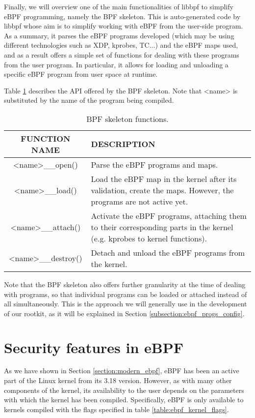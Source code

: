 Finally, we will overview one of the main functionalities of libbpf to simplify eBPF programming, namely the BPF skeleton. This is auto-generated code by libbpf whose aim is to simplify working with eBPF from the user-side program. As a summary, it parses the eBPF programs developed (which may be using different technologies such as XDP, kprobes, TC...) and the eBPF maps used, and as a result offers a simple set of functions for dealing with these programs from the user program. In particular, it allows for loading and unloading a specific eBPF program from user space at runtime.

Table \ref{table:libbpf_skel} describes the API offered by the BPF skeleton. Note that <name> is substituted by the name of the program being compiled.

\begin{table}[htbp]
\begin{tabular}{|c|>{\centering\arraybackslash}p{9cm}|}
\hline
\textbf{FUNCTION NAME} & \textbf{DESCRIPTION}\\
\hline
\hline
<name>\_\_open() & Parse the eBPF programs and maps.\\
\hline
<name>\_\_load() & Load the eBPF map in the kernel after its validation, create the maps. However, the programs are not active yet.\\
\hline
<name>\_\_attach() & Activate the eBPF programs, attaching them to their corresponding parts in the kernel (e.g. kprobes to kernel functions).\\
\hline
<name>\_\_destroy() & Detach and unload the eBPF programs from the kernel.\\
\hline
\end{tabular}
\caption{BPF skeleton functions.}
\label{table:libbpf_skel}
\end{table}

Note that the BPF skeleton also offers further granularity at the time of dealing with programs, so that individual programs can be loaded or attached instead of all simultaneously. This is the approach we will generally use in the development of our rootkit, as it will be explained in Section \ref{subsection:ebpf_progs_config}.



\section{Security features in eBPF} \label{section:ebpf_security}
As we have shown in Section \ref{section:modern_ebpf}, eBPF has been an active part of the Linux kernel from its 3.18 version. However, as with many other components of the kernel, its availability to the user depends on the parameters with which the kernel has been compiled. Specifically, eBPF is only available to kernels compiled with the flags specified in table \ref{table:ebpf_kernel_flags}.

